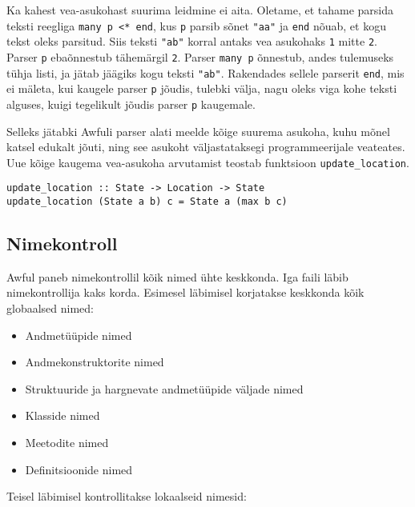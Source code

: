 \documentclass[12pt]{article}
\begin{document}
        Ka kahest vea-asukohast suurima leidmine ei aita. Oletame, et tahame parsida teksti reegliga \verb!many p <* end!, kus \verb!p! parsib sõnet \verb!"aa"! ja \verb!end! nõuab, et kogu tekst oleks parsitud. Siis teksti \verb!"ab"! korral antaks vea asukohaks \verb!1! mitte \verb!2!. Parser \verb!p! ebaõnnestub tähemärgil \verb!2!. Parser \verb!many p! õnnestub, andes tulemuseks tühja listi, ja jätab jäägiks kogu teksti \verb!"ab"!. Rakendades sellele parserit \verb!end!, mis ei mäleta, kui kaugele parser \verb!p! jõudis, tulebki välja, nagu oleks viga kohe teksti alguses, kuigi tegelikult jõudis parser \verb!p! kaugemale.

        Selleks jätabki Awfuli parser alati meelde kõige suurema asukoha, kuhu mõnel katsel edukalt jõuti, ning see asukoht väljastataksegi programmeerijale veateates. Uue kõige kaugema vea-asukoha arvutamist teostab funktsioon \verb!update_location!.

        \begin{verbatim}update_location :: State -> Location -> State
update_location (State a b) c = State a (max b c)\end{verbatim}
    \subsection{Nimekontroll}
      Awful paneb nimekontrollil kõik nimed ühte keskkonda. Iga faili läbib nimekontrollija kaks korda. Esimesel läbimisel korjatakse keskkonda kõik globaalsed nimed:

      \begin{itemize}
        \item
          Andmetüüpide nimed
        \item
          Andmekonstruktorite nimed
        \item
          Struktuuride ja hargnevate andmetüüpide väljade nimed
        \item
          Klasside nimed
        \item
          Meetodite nimed
        \item
          Definitsioonide nimed
      \end{itemize}

      Teisel läbimisel kontrollitakse lokaalseid nimesid:
\end{document}
